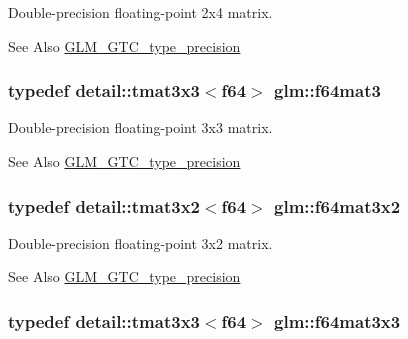 Double-\/precision floating-\/point 2x4 matrix. 

\begin{DoxySeeAlso}{See Also}
\hyperlink{group__gtc__type__precision}{G\-L\-M\-\_\-\-G\-T\-C\-\_\-type\-\_\-precision} 
\end{DoxySeeAlso}
\hypertarget{group__gtc__type__precision_ga1a05ac0a6e87b279e77d877968f391bc}{
\subsubsection[{f64mat3}]{\setlength{\rightskip}{0pt plus 5cm}typedef detail\-::tmat3x3$<$f64$>$ {\bf glm\-::f64mat3}}}\label{group__gtc__type__precision_ga1a05ac0a6e87b279e77d877968f391bc}


Double-\/precision floating-\/point 3x3 matrix. 

\begin{DoxySeeAlso}{See Also}
\hyperlink{group__gtc__type__precision}{G\-L\-M\-\_\-\-G\-T\-C\-\_\-type\-\_\-precision} 
\end{DoxySeeAlso}
\hypertarget{group__gtc__type__precision_gaa3edc3353425c0b14b91ebde718d5bd5}{
\subsubsection[{f64mat3x2}]{\setlength{\rightskip}{0pt plus 5cm}typedef detail\-::tmat3x2$<$f64$>$ {\bf glm\-::f64mat3x2}}}\label{group__gtc__type__precision_gaa3edc3353425c0b14b91ebde718d5bd5}


Double-\/precision floating-\/point 3x2 matrix. 

\begin{DoxySeeAlso}{See Also}
\hyperlink{group__gtc__type__precision}{G\-L\-M\-\_\-\-G\-T\-C\-\_\-type\-\_\-precision} 
\end{DoxySeeAlso}
\hypertarget{group__gtc__type__precision_gac0fe6a1fb044122b28859feede132b75}{
\subsubsection[{f64mat3x3}]{\setlength{\rightskip}{0pt plus 5cm}typedef detail\-::tmat3x3$<$f64$>$ {\bf glm\-::f64mat3x3}}}\label{group__gtc__type__precision_gac0fe6a1fb044122b28859feede132b75}


